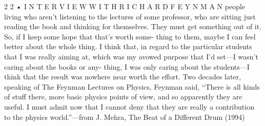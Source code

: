 \documentclass[10pt,oneside]{article}
\begin{document}
2 2 • I N T E R V I E W  W I T H  R I C H A R D  F E Y N M A N people living who aren’t listening to the lectures of some professor, who are sitting just reading the book and thinking for themselves. They must get something out of it. So, if I keep some hope that that’s worth some- thing to them, maybe I can feel better about the whole thing. I think that, in regard to the particular students that I was really aiming at, which was my avowed purpose that I’d set---I wasn’t caring about the books or any- thing, I was only caring about the students---I think that the result was nowhere near worth the effort.\emph{ } Two decades later, speaking of The Feynman Lectures on Physics, Feynman said, “There is all kinds of stuff there, more basic physics points of view, and so apparently they are useful. I must admit now that I cannot deny that they are really a contribution to the physics world.”---from J. Mehra, The Beat of a Different Drum (1994)\par

\clearpage
{}
\end{document}
